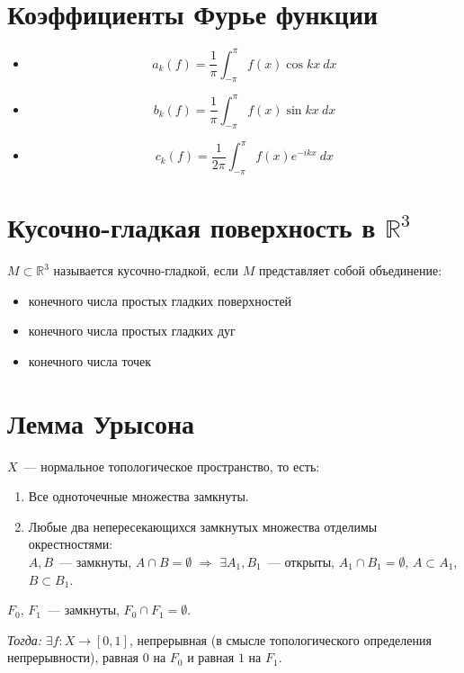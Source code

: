 \documentclass[paper=a4, fontsize=14pt]{article}
\begin{document}
\section{Коэффициенты Фурье функции}

\begin{itemize}
\item $$ a_k(f) = \frac{1}{\pi} \int_{-\pi}^{\pi} f(x) \cos kx ~ dx $$

\item $$ b_k(f) = \frac{1}{\pi} \int_{-\pi}^{\pi} f(x) \sin kx ~ dx $$

\item $$ c_k(f) = \frac{1}{2\pi} \int_{-\pi}^{\pi} f(x) e^{-ikx} ~ dx $$

\end{itemize}

\section{Кусочно-гладкая поверхность в $\mathds{R}^3$}

$M \subset \mathbb R^3$ называется кусочно-гладкой, если $M$ представляет собой объединение:

\begin{itemize}
\item конечного числа простых гладких поверхностей
\item конечного числа простых гладких дуг
\item конечного числа точек
\end{itemize}

\section{Лемма Урысона}
$X$~--- нормальное топологическое пространство, то есть:
\begin{enumerate}
\item Все одноточечные множества замкнуты.
\item Любые два непересекающихся замкнутых множества отделимы окрестностями:\\
$A,B$~--- замкнуты, $A \cap B = \emptyset$ $\Rightarrow$ $\exists A_1,B_1$~--- открыты, $A_1 \cap B_1 = \emptyset$,
$A \subset A_1$, $B \subset B_1$.
\end{enumerate}

$F_0$, $F_1$~--- замкнуты, $F_0 \cap F_1 = \emptyset$.

\emph{Тогда:} $\exists f: X \rightarrow [0,1]$, непрерывная (в смысле топологического определения непрерывности), равная $0$ на $F_0$ и равная $1$ на $F_1$.
\end{document}
